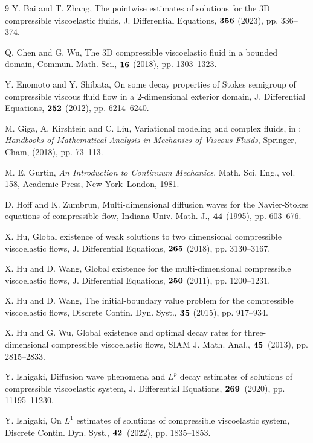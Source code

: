 \documentclass[dvipdfmx,12pt]{article}
\begin{document}
\begin{thebibliography}{9}
Y. Bai and T. Zhang, The pointwise estimates of solutions for the 3D compressible viscoelastic fluids, J. Differential Equations, $\bf{356}$ (2023), pp. 336–374.

Q. Chen and G. Wu, The 3D compressible viscoelastic fluid in a bounded domain, Commun. Math. Sci., $\bf{16}$ (2018), pp. 1303–1323.

Y. Enomoto and Y. Shibata, On some decay properties of Stokes semigroup of compressible viscous fluid flow in a 2-dimensional exterior domain, J. Differential Equations, $\bf{252}$ (2012), pp. 6214–6240.

M. Giga, A. Kirshtein and C. Liu, Variational modeling and complex fluids, in : \textit{Handbooks of Mathematical Analysis in Mechanics of Viscous Fluids}, Springer, Cham, (2018), pp. 73--113.

M. E. Gurtin, \textit{An Introduction to Continuum Mechanics}, Math. Sci. Eng., vol. 158, Academic Press, New York--London, 1981.

D. Hoff and K. Zumbrun, Multi-dimensional diffusion waves for the Navier-Stokes equations of compressible ﬂow, Indiana Univ. Math. J., $\bf{44}$ (1995), pp. 603--676.

X. Hu, Global existence of weak solutions to two dimensional compressible viscoelastic flows, J. Differential Equations, $\bf{265}$ (2018), pp. 3130--3167.

X. Hu and D. Wang, Global existence for the multi-dimensional compressible viscoelastic flows, J. Differential Equations, $\bf{250}$ (2011), pp. 1200--1231.

X. Hu and D. Wang, The initial-boundary value problem for the compressible viscoelastic flows, Discrete Contin. Dyn. Syst., $\bf{35}$ (2015), pp. 917–934.

X. Hu and G. Wu, Global existence and optimal decay rates for three-dimensional compressible viscoelastic flows, SIAM J. Math. Anal., $\bf{45}$~(2013),  pp. 2815--2833.

Y. Ishigaki, Diffusion wave phenomena and $L^p$  decay estimates of solutions of compressible viscoelastic system, J. Differential Equations, $\bf{269}$~(2020), pp. 11195–11230.

Y. Ishigaki, On $L^1$ estimates of solutions of compressible viscoelastic system, Discrete Contin. Dyn. Syst., $\bf{42}$~(2022), pp. 1835–1853.


\end{thebibliography}
\end{document}
